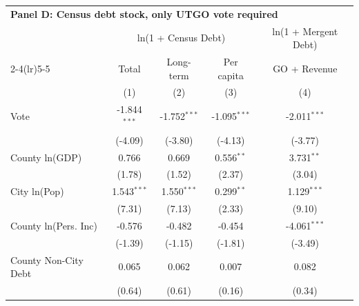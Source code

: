 \begingroup
\centering
\begin{tabular*}{\textwidth}{@{\extracolsep{\fill}}lcccc}
\multicolumn{5}{l}{\textbf{Panel D: Census debt stock, only UTGO vote required}}\\

\addlinespace
   \toprule
                        & \multicolumn{3}{c}{ln(1 + Census Debt)} & \multicolumn{1}{c}{ln(1 + Mergent Debt)}\\  
   \cmidrule(lr){2-4}\cmidrule(lr){5-5}
                        & Total                     & Long-term                     & Per capita                           & GO + Revenue \\   
                        & (1)                       & (2)                           & (3)                                  & (4)\\  
   \midrule 
   Vote                 & -1.844$^{***}$            & -1.752$^{***}$                & -1.095$^{***}$                       & -2.011$^{***}$\\   
                        & (-4.09)                  & (-3.80)                      & (-4.13)                             & (-3.77)\\   
   County ln(GDP)       & 0.766                     & 0.669                         & 0.556$^{**}$                         & 3.731$^{**}$\\   
                        & (1.78)                   & (1.52)                       & (2.37)                              & (3.04)\\   
   City ln(Pop)         & 1.543$^{***}$             & 1.550$^{***}$                 & 0.299$^{**}$                         & 1.129$^{***}$\\   
                        & (7.31)                   & (7.13)                       & (2.33)                              & (9.10)\\   
   County ln(Pers. Inc) & -0.576                    & -0.482                        & -0.454                               & -4.061$^{***}$\\   
                        & (-1.39)                  & (-1.15)                      & (-1.81)                             & (-3.49)\\   
   County Non-City Debt & 0.065                     & 0.062                         & 0.007                                & 0.082\\   
                        & (0.64)                   & (0.61)                       & (0.16)                              & (0.34)\\   

\end{tabular*}
